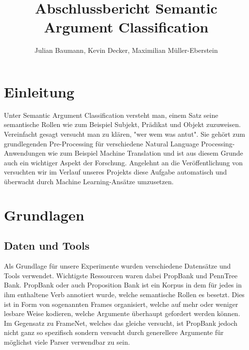 \documentclass[]{article}
\title{Abschlussbericht Semantic Argument Classification}
\author{Julian Baumann, Kevin Decker, Maximilian Müller-Eberstein}
\begin{document}
\maketitle

\section{Einleitung}
Unter Semantic Argument Classification versteht man, einem Satz seine semantische Rollen wie zum Beispiel Subjekt, Prädikat und Objekt zuzuweisen. Vereinfacht gesagt versucht man zu klären, "wer wem was antut". Sie gehört zum grundlegenden Pre-Processing für verschiedene Natural Language Processing-Anwendungen wie zum Beispiel Machine Translation und ist aus diesem Grunde auch ein wichtiger Aspekt der Forschung. Angelehnt an die Veröffentlichung von \cite{Pradhan05supportvector} versuchten wir im Verlauf unseres Projekts diese Aufgabe automatisch und überwacht durch Machine Learning-Ansätze umzusetzen. 

\section{Grundlagen}
\subsection{Daten und Tools}
Als Grundlage für unsere Experimente wurden verschiedene Datensätze und Tools verwendet. Wichtigste Ressourcen waren dabei PropBank und PennTree Bank. PropBank \cite{Palmer:2005:PBA:1122624.1122628} oder auch Proposition Bank ist ein Korpus in dem für jedes in ihm enthaltene Verb annotiert wurde, welche semantische Rollen es besetzt. Dies ist in Form von sogenannten Frames organisiert, welche auf mehr oder weniger lesbare Weise kodieren, welche Argumente überhaupt gefordert werden können. Im Gegensatz zu FrameNet, welches das gleiche versucht, ist PropBank jedoch nicht ganz so spezifisch sondern versucht durch generellere Argumente für möglichst viele Parser verwendbar zu sein.\\ 
\end{document}
